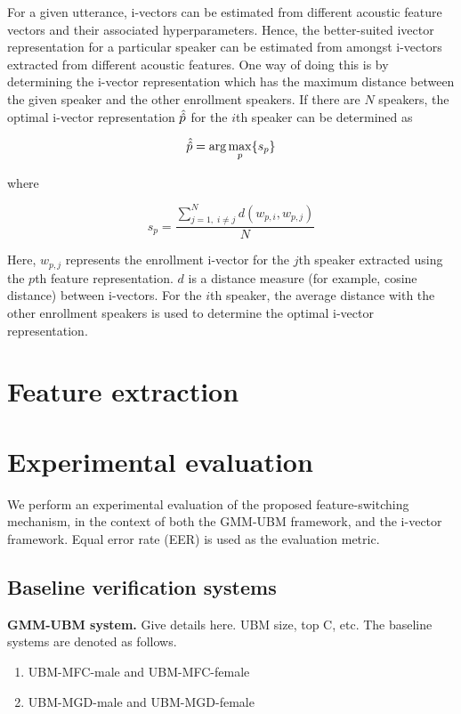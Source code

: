 \documentclass{article}
\begin{document}
For a given utterance, i-vectors can be estimated from different acoustic
feature vectors and their associated hyperparameters. Hence, the
better-suited ivector representation for a particular speaker can be estimated
from amongst i-vectors extracted from different acoustic features. One way of
doing this is by determining the i-vector representation which has the maximum
distance between the given speaker and the other enrollment speakers. If there
are $N$ speakers, the optimal i-vector representation $\Hat{\Hat{p}}$ 
for the $i$th speaker can be determined as

\begin{equation}
\Hat{\Hat{p}} = \arg\max_p \{s_p\}
\end{equation}

where 

\begin{equation}
s_p = \frac{\displaystyle \sum_{j=1, \; i \neq j}^N d(w_{p,i},w_{p,j})}{N}
\end{equation}

Here, $w_{p,j}$ represents the enrollment i-vector for the $j$th speaker
extracted using the $p$th feature representation. $d$ is a distance measure (for
example, cosine distance) between i-vectors. For the $i$th speaker, the average
distance with the other enrollment speakers is used to determine the optimal
i-vector representation.

\section{Feature extraction}

\section{Experimental evaluation}

We perform an experimental evaluation of the proposed feature-switching
mechanism, in the context of both the GMM-UBM framework, and the i-vector
framework. Equal error rate (EER) is used as the evaluation metric.

\subsection{Baseline verification systems}
\textbf{GMM-UBM system.} Give details here. UBM size, top C, etc.
The baseline systems are denoted as follows.
\begin{enumerate}
\item UBM-MFC-male and UBM-MFC-female
\item UBM-MGD-male and UBM-MGD-female
\end{enumerate}
\end{document}
